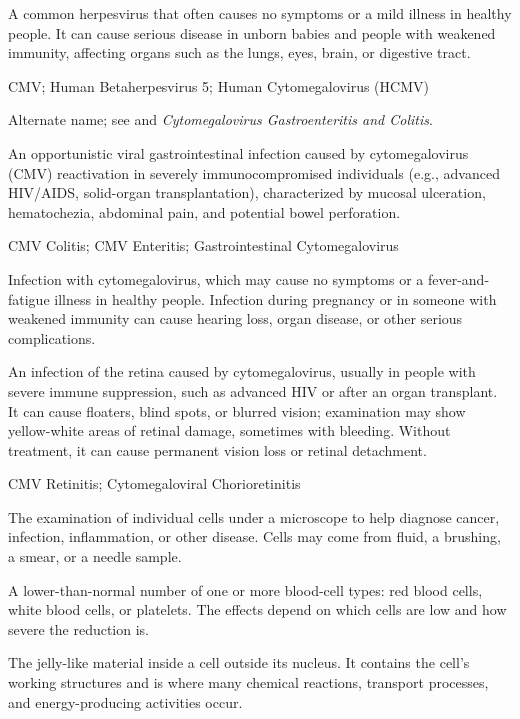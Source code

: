  A common herpesvirus that often causes no symptoms or a mild illness in healthy people. It can cause serious disease in unborn babies and people with weakened immunity, affecting organs such as the lungs, eyes, brain, or digestive tract.

\synonyms
CMV; Human Betaherpesvirus 5; Human Cytomegalovirus (HCMV)

 Alternate name; see  and \textit{Cytomegalovirus Gastroenteritis and Colitis}.

 An opportunistic viral gastrointestinal infection caused by cytomegalovirus (CMV) reactivation in severely immunocompromised individuals (e.g., advanced HIV/AIDS, solid-organ transplantation), characterized by mucosal ulceration, hematochezia, abdominal pain, and potential bowel perforation.

\synonyms
CMV Colitis; CMV Enteritis; Gastrointestinal Cytomegalovirus

 Infection with cytomegalovirus, which may cause no symptoms or a fever-and-fatigue illness in healthy people. Infection during pregnancy or in someone with weakened immunity can cause hearing loss, organ disease, or other serious complications.

 An infection of the retina caused by cytomegalovirus, usually in people with severe immune suppression, such as advanced HIV or after an organ transplant. It can cause floaters, blind spots, or blurred vision; examination may show yellow-white areas of retinal damage, sometimes with bleeding. Without treatment, it can cause permanent vision loss or retinal detachment.

\synonyms
CMV Retinitis; Cytomegaloviral Chorioretinitis

 The examination of individual cells under a microscope to help diagnose cancer, infection, inflammation, or other disease. Cells may come from fluid, a brushing, a smear, or a needle sample.

 A lower-than-normal number of one or more blood-cell types: red blood cells, white blood cells, or platelets. The effects depend on which cells are low and how severe the reduction is.

 The jelly-like material inside a cell outside its nucleus. It contains the cell's working structures and is where many chemical reactions, transport processes, and energy-producing activities occur.

